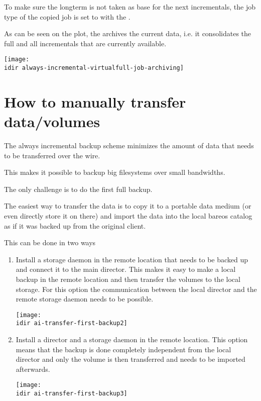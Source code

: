 To make sure the longterm  is not taken as base for the next incrementals,
the job type of the copied job is set to 
with the .

As can be seen on the plot, the  archives the current data,
i.e. it consolidates the full and all incrementals that are currently available.

\begin{center}
\texttt{[image: \\idir always-incremental-virtualfull-job-archiving]}
\end{center}


\chapter{How to manually transfer data/volumes}

The always incremental backup scheme minimizes the amount of data that needs 
to be transferred over the wire.

This makes it possible to backup big filesystems over small bandwidths.

The only challenge is to do the first full backup.


The easiest way to transfer the data is to copy it to a portable 
data medium (or even directly store it on there) and import the 
data into the local bareos catalog as if it was backed up from the 
original client.


This can be done in two ways

\begin{enumerate}
    \item Install a storage daemon in the remote location that needs to be backed up and connect it to the main director.
   This makes it easy to make a local backup in the remote location and then transfer the volumes to the local storage.
   For this option the communication between the local director and the remote storage daemon needs to be possible.
\begin{center}
\texttt{[image: \\idir ai-transfer-first-backup2]}
\end{center}

    \item Install a director and a storage daemon in the remote location.
   This option means that the backup is done completely independent from the local director and only the volume is then transferred and needs to be imported afterwards. 
\begin{center}
\texttt{[image: \\idir ai-transfer-first-backup3]}
\end{center}

\end{enumerate}


